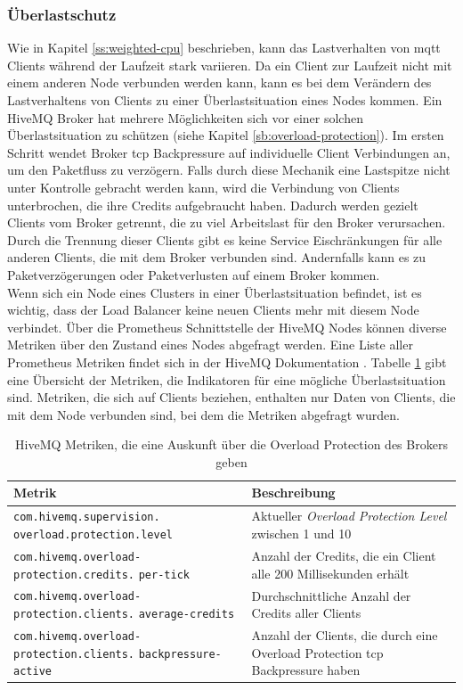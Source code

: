 \subsubsection{Überlastschutz} \label{ss:circuit-breaking}
Wie in Kapitel \ref{ss:weighted-cpu} beschrieben, kann das Lastverhalten von \ac{mqtt} Clients während der Laufzeit stark variieren. Da ein Client zur Laufzeit nicht mit einem anderen Node verbunden werden kann, kann es bei dem Verändern des Lastverhaltens von Clients zu einer Überlastsituation eines Nodes kommen.
Ein HiveMQ Broker hat mehrere Möglichkeiten sich vor einer solchen Überlastsituation zu schützen (siehe Kapitel \ref{sb:overload-protection}).
Im ersten Schritt wendet Broker \ac{tcp} Backpressure auf individuelle Client Verbindungen an, um den Paketfluss zu verzögern.
Falls durch diese Mechanik eine Lastspitze nicht unter Kontrolle gebracht werden kann, wird die Verbindung von Clients unterbrochen, die ihre Credits aufgebraucht haben.
Dadurch werden gezielt Clients vom Broker getrennt, die zu viel Arbeitslast für den Broker verursachen.
Durch die Trennung dieser Clients gibt es keine Service Eischränkungen für alle anderen Clients, die mit dem Broker verbunden sind. Andernfalls kann es zu Paketverzögerungen oder Paketverlusten auf einem Broker kommen.
\\
Wenn sich ein Node eines Clusters in einer Überlastsituation befindet, ist es wichtig, dass der Load Balancer keine neuen Clients mehr mit diesem Node verbindet.
Über die Prometheus Schnittstelle der HiveMQ Nodes können diverse Metriken über den Zustand eines Nodes abgefragt werden.
Eine Liste aller Prometheus Metriken findet sich in der HiveMQ Dokumentation \cite{MonitoringHiveMQDocumentation}.
Tabelle \ref{table:overload-protection-metrics} gibt eine Übersicht der Metriken, die Indikatoren für eine mögliche Überlastsituation sind. Metriken, die sich auf Clients beziehen, enthalten nur Daten von Clients, die mit dem Node verbunden sind, bei dem die Metriken abgefragt wurden.
\begin{table}[htbp]
\centering
\renewcommand{\arraystretch}{1.5}
\begin{tabularx}{\textwidth}{|p{5cm}|X|}
    \hline
    \textbf{Metrik} & \textbf{Beschreibung} \\
    \hline
    \hline
    \verb|com.hivemq.supervision.| \verb|overload.protection.level| & Aktueller \textit{Overload Protection Level} zwischen 1 und 10 \\
    \hline
    \verb|com.hivemq.overload-| \verb|protection.credits.| \verb|per-tick| & Anzahl der Credits, die ein Client alle 200 Millisekunden erhält \\
    \hline
    \verb|com.hivemq.overload-| \verb|protection.clients.| \verb|average-credits| & Durchschnittliche Anzahl der Credits aller Clients \\
    \hline
    \verb|com.hivemq.overload-| \verb|protection.clients.| \verb|backpressure-active| & Anzahl der Clients, die durch eine Overload Protection \ac{tcp} Backpressure haben \\
    \hline
\end{tabularx}
\caption{HiveMQ Metriken, die eine Auskunft über die Overload Protection des Brokers geben}
\label{table:overload-protection-metrics}
\end{table}
